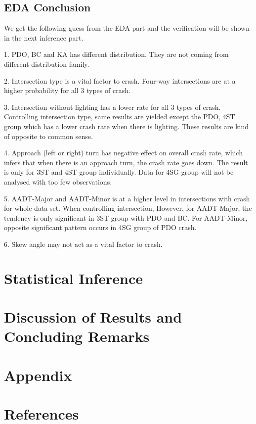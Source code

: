 \documentclass[11pt]{scrartcl} %
\begin{document}
\subsection{EDA Conclusion}

We get the following guess from the EDA part and the verification will be shown in the next inference part.

1. PDO, BC and KA has different distribution. They are not coming from different distribution family.

2. Intersection type is a vital factor to crash. Four-way intersections are at a higher probability for all 3 types of crash.

3. Intersection without lighting has a lower rate for all 3 types of crash. Controlling intersection type, same results are yielded except the PDO, 4ST group which has a lower crash rate when there is lighting. These results are kind of opposite to common sense.

4. Approach (left or right) turn has negative effect on overall crash rate, which infers that when there is an approach turn, the crash rate goes down. The result is only for 3ST and 4ST group individually. Data for 4SG group will not be analysed with too few observations.

5. AADT-Major and AADT-Minor is at a higher level in intersections with crash for whole data set. When controlling intersection, However, for AADT-Major, the tendency is only significant in 3ST group with PDO and BC. For AADT-Minor, opposite significant pattern occurs in 4SG group of PDO crash.

6. Skew angle may not act as a vital factor to crash. 

\section{Statistical Inference}


\section{Discussion of Results and Concluding Remarks}


\section{Appendix}


\section{References}
\end{document}
